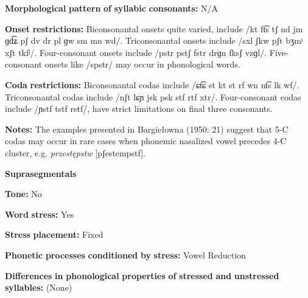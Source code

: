 \begin{styleBody}
\textbf{Morphological} \textbf{pattern} \textbf{of} \textbf{syllabic} \textbf{consonants:} N/A
\end{styleBody}

\begin{styleBody}
\textbf{Onset} \textbf{restrictions:} Biconsonantal onsets quite varied, include /kt ft͡s tʃ nd jm ɡd͡ʑ pʃ dv dr pl ɡw sm mn wd/. Triconsonantal onsets include /sxl ʃkw pʃt bʒmʲ xʃt tkfʲ/. Four-consonant onsets include /pstr pstʃ fstr drɡn fksʃ vzɡl/. Five-consonant onsets like /spstr/ may occur in phonological words.
\end{styleBody}

\begin{styleBody}
\textbf{Coda} \textbf{restrictions:} Biconsonantal codas include /ɕt͡ɕ st kt st rf wn nt͡s lk wf/. Triconsonantal codas include /nʃt lɕɲ jsk psk stf rtf xtr/. Four-consonant codas include /ɲstf tstf rstf/, have strict limitations on final three consonants.
\end{styleBody}

\begin{styleBody}
\textbf{Notes:} The examples presented in Bargiełowna (1950: 21) suggest that 5-C codas may occur in rare cases when phonemic nasalized vowel precedes 4-C cluster, e.g. \textit{przestępstw} [pʃestempstf].
\end{styleBody}

\begin{styleBody}
\textbf{Suprasegmentals}
\end{styleBody}

\begin{styleBody}
\textbf{Tone:} No
\end{styleBody}

\begin{styleBody}
\textbf{Word} \textbf{stress:} Yes
\end{styleBody}

\begin{styleBody}
\textbf{Stress} \textbf{placement:} Fixed
\end{styleBody}

\begin{styleBody}
\textbf{Phonetic} \textbf{processes} \textbf{conditioned} \textbf{by} \textbf{stress:} Vowel Reduction
\end{styleBody}

\begin{styleBody}
\textbf{Differences} \textbf{in} \textbf{phonological} \textbf{properties} \textbf{of} \textbf{stressed} \textbf{and} \textbf{unstressed} \textbf{syllables:} (None)
\end{styleBody}

